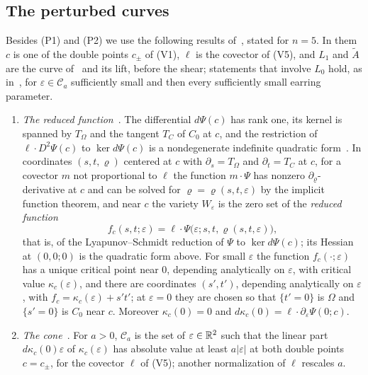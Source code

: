 \subsection{The perturbed curves}\label{ss:perturbed-P}

Besides (P1) and (P2) we use the following results of~\cite[\S\S5--6]{WuebbenV}, stated for $n=5$. In them $c$
is one of the double points $c_\pm$ of (V1), $\ell$ is the covector of (V5), and $L_1$ and $\tilde A$ are the curve
of~\cite{WuebbenV} and its lift, before the shear; statements that involve $L_0$ hold, as in~\cite[\S6]{WuebbenV}, for
$\varepsilon\in\mathcal C_a$ sufficiently small and then every sufficiently small earring parameter.
\begin{enumerate}
\item[(P3)] \emph{The reduced function}~\cite[\S5.2]{WuebbenV}. The differential $d\Psi(c)$ has rank one, its kernel is
spanned by $T_\Omega$ and the tangent $T_C$ of $C_0$ at $c$, and the restriction of $\ell\cdot D^2\Psi(c)$ to $\ker d\Psi(c)$ is
a nondegenerate indefinite quadratic form~\cite[Prop.~3.11]{WuebbenV}. In coordinates $(s,t,\varrho)$ centered at $c$
with $\partial_s=T_\Omega$ and $\partial_t=T_C$ at $c$, for a covector $m$ not proportional to $\ell$ the function $m\cdot\Psi$ has nonzero $\partial_\varrho$-derivative at $c$ and can be solved for
$\varrho=\varrho(s,t,\varepsilon)$ by the implicit function theorem, and near $c$ the variety $W_\varepsilon$ is the zero set of the
\emph{reduced function}
\[
f_c(s,t;\varepsilon)=\ell\cdot\Psi\bigl(\varepsilon;s,t,\varrho(s,t,\varepsilon)\bigr),
\]
that is, of the Lyapunov--Schmidt reduction of $\Psi$ to $\ker d\Psi(c)$; its Hessian at $(0,0;0)$ is the quadratic form
above. For small $\varepsilon$ the function $f_c(\cdot;\varepsilon)$ has a unique critical point near $0$, depending
analytically on $\varepsilon$, with critical value $\kappa_c(\varepsilon)$, and there are coordinates $(s',t')$, depending
analytically on $\varepsilon$, with $f_c=\kappa_c(\varepsilon)+s't'$; at $\varepsilon=0$ they are chosen so that $\{t'=0\}$ is
$\Omega$ and $\{s'=0\}$ is $C_0$ near $c$. Moreover $\kappa_c(0)=0$ and $d\kappa_c(0)=\ell\cdot\partial_\varepsilon\Psi(0;c)$.
\item[(P4)] \emph{The cone}~\cite[Def.~5.5]{WuebbenV}. For $a>0$, $\mathcal C_a$ is the set of $\varepsilon\in\mathbb{R}^2$ such that
the linear part $d\kappa_c(0)\varepsilon$ of $\kappa_c(\varepsilon)$ has absolute value at least $a|\varepsilon|$ at both double points $c=c_\pm$, for the covector $\ell$ of (V5); another normalization of $\ell$ rescales $a$.

\end{enumerate}
